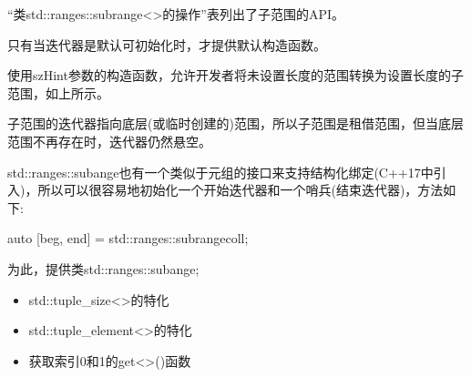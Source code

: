 “类std::ranges::subrange<>的操作”表列出了子范围的API。

只有当迭代器是默认可初始化时，才提供默认构造函数。

使用szHint参数的构造函数，允许开发者将未设置长度的范围转换为设置长度的子范围，如上所示。

子范围的迭代器指向底层(或临时创建的)范围，所以子范围是租借范围，但当底层范围不再存在时，迭代器仍然悬空。


std::ranges::subange也有一个类似于元组的接口来支持结构化绑定(C++17中引入)，所以可以很容易地初始化一个开始迭代器和一个哨兵(结束迭代器)，方法如下:

\begin{cpp}
auto [beg, end] = std::ranges::subrange{coll};
\end{cpp}

为此，提供类std::ranges::subange;

\begin{itemize}
\item
std::tuple\_size<>的特化

\item
std::tuple\_element<>的特化

\item
获取索引0和1的get<>()函数
\end{itemize}

